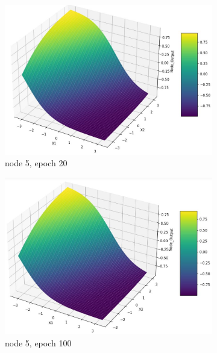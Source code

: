 \documentclass[11pt]{article}
\begin{document}
\begin{figure}[h!]
\begin{subfigure}[b]{0.3\textwidth}
	\includegraphics[scale=0.14]{hidden1_n5_e20.jpg}
	\caption{node 5, epoch 20}
	\label{fig:fig2.1.5.3}
	\end{subfigure}
	\begin{subfigure}[b]{0.45\textwidth}
	\centering
	\includegraphics[scale=0.14]{hidden1_n5_e100.jpg}
	\caption{node 5, epoch 100}
	\label{fig:fig2.1.5.4}
	\end{subfigure}
	\begin{subfigure}[b]{0.45\textwidth}
	\centering

\end{subfigure}
\end{figure}
\end{document}
